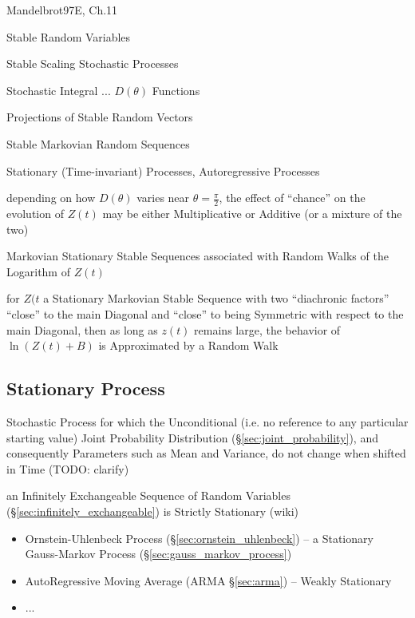 Mandelbrot97E, Ch.11

Stable Random Variables

Stable Scaling Stochastic Processes

Stochastic Integral ... $D(\theta)$ Functions

Projections of Stable Random Vectors

Stable Markovian Random Sequences

Stationary (Time-invariant) Processes, Autoregressive Processes

depending on how $D(\theta)$ varies near $\theta = \frac{\pi}{2}$, the effect of
``chance'' on the evolution of $Z(t)$ may be either Multiplicative or Additive
(or a mixture of the two)

Markovian Stationary Stable Sequences associated with Random Walks of the
Logarithm of $Z(t)$

for $Z(t$ a Stationary Markovian Stable Sequence with two ``diachronic factors''
``close'' to the main Diagonal and ``close'' to being Symmetric with respect to
the main Diagonal, then as long as $z(t)$ remains large, the behavior of
$\ln(Z(t) + B)$ is Approximated by a Random Walk



\subsection{Stationary Process}\label{sec:stationary_process}

Stochastic Process for which the Unconditional (i.e. no reference to any
particular starting value) Joint Probability Distribution
(\S\ref{sec:joint_probability}), and consequently Parameters such as Mean and
Variance, do not change when shifted in Time (TODO: clarify)

\fist an Infinitely Exchangeable Sequence of Random Variables
(\S\ref{sec:infinitely_exchangeable}) is Strictly Stationary (wiki)

\begin{itemize}
  \item Ornstein-Uhlenbeck Process (\S\ref{sec:ornstein_uhlenbeck}) -- a
    Stationary Gauss-Markov Process (\S\ref{sec:gauss_markov_process})
  \item AutoRegressive Moving Average (ARMA \S\ref{sec:arma}) -- Weakly
    Stationary
  \item ...
\end{itemize}

